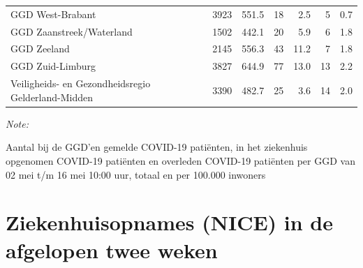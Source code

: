 \documentclass[
  english,
  man,floatsintext]{apa6}
\begin{document}
\begin{table}
\begin{threeparttable}
\begin{tabular}{lrrrrrr}
GGD West-Brabant & 3923 & 551.5 & 18 & 2.5 & 5 & 0.7\\
GGD Zaanstreek/Waterland & 1502 & 442.1 & 20 & 5.9 & 6 & 1.8\\
GGD Zeeland & 2145 & 556.3 & 43 & 11.2 & 7 & 1.8\\
GGD Zuid-Limburg & 3827 & 644.9 & 77 & 13.0 & 13 & 2.2\\
Veiligheids- en Gezondheidsregio Gelderland-Midden & 3390 & 482.7 & 25 & 3.6 & 14 & 2.0\\
\bottomrule
\end{tabular}
\begin{tablenotes}
\item \textit{Note: } 
\item Aantal bij de GGD’en gemelde COVID-19 patiënten, in het ziekenhuis opgenomen COVID-19 patiënten en overleden COVID-19 patiënten per GGD van 02 mei t/m 16 mei 10:00 uur, totaal en per 100.000 inwoners
\end{tablenotes}
\end{threeparttable}
\endgroup{}
\end{table}

\newpage

\hypertarget{ziekenhuisopnames-nice-in-de-afgelopen-twee-weken}{%
\section{Ziekenhuisopnames (NICE) in de afgelopen twee weken}\label{ziekenhuisopnames-nice-in-de-afgelopen-twee-weken}}
\end{document}
